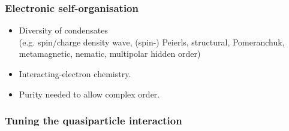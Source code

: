 \begin{frame}[label=ElecStates]
\frametitle{Electronic self-organisation}

\centerline{}
\vspace{2ex}

\begin{itemize}
\item<visible@5-> Diversity of condensates\\ {\small (e.g. spin/charge
density wave, (spin-) Peierls, structural,
Pomeranchuk, metamagnetic, nematic, multipolar 
hidden order)}

\item<visible@6-> Interacting-electron chemistry.

\item<visible@6-> Purity needed to allow complex order.
\end{itemize}

\end{frame}

\begin{frame}[label=ElecLiquid]
\frametitle{Tuning the quasiparticle interaction}

\centerline{}
\vspace{2ex}


\end{frame}


